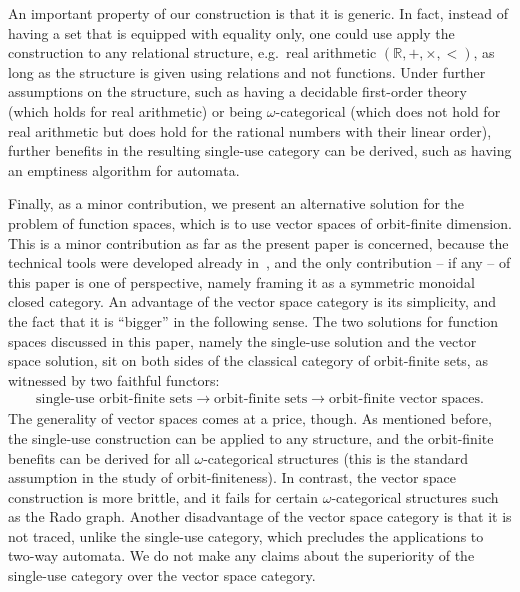 An important property of our construction is that it is generic. In fact, instead of having a set that is equipped with equality only, one could use apply the construction to any relational structure, e.g.~real arithmetic $(\mathbb R, +, \times, <)$, as long as the structure is given using relations and not functions. Under further assumptions on the structure, such as having a decidable first-order theory (which holds for real arithmetic) or being $\omega$-categorical (which does not hold for real arithmetic but does hold for the rational numbers with their linear order), further benefits in the resulting single-use category can be derived, such as having an emptiness algorithm for automata. 

Finally, as a minor contribution, we present an alternative solution for the problem of function spaces, which is  to use vector spaces of orbit-finite dimension. This is a minor contribution as far as the present paper is concerned, because the technical tools were developed already in~\cite{bojanczykKM21OrbitFiniteVector}, and the only contribution -- if any -- of this paper is one of perspective, namely framing it as a symmetric monoidal closed category. An advantage of the vector space category is its simplicity, and the fact that it is ``bigger'' in the following sense. The two solutions for function spaces discussed in this paper, namely the single-use solution and the vector space solution, sit on both sides of the classical category of orbit-finite sets, as witnessed by two faithful functors: 
\begin{align*}
\text{single-use orbit-finite sets} 
\to 
\text{orbit-finite sets}
\to 
\text{orbit-finite vector spaces}.
\end{align*}
The generality of vector spaces comes at a price, though. As mentioned before, the single-use construction can be applied to any structure, and the orbit-finite benefits can be derived for all $\omega$-categorical structures (this is the standard assumption in the study of orbit-finiteness). In contrast, the vector space construction is more brittle, and it fails for certain $\omega$-categorical  structures such as the Rado graph.   Another disadvantage of the vector space category is that it is not traced, unlike the single-use category, which precludes the applications to two-way automata. We do not make any claims about the superiority of the single-use category over the vector space category. 
